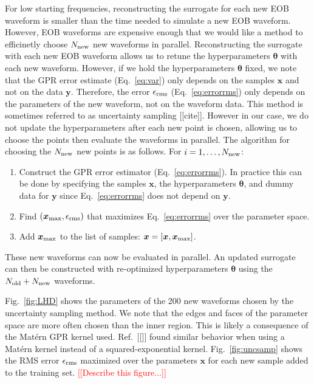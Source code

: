 \documentclass[prd,aps,letter,twocolumn,floatfix,notitlepage,nofootinbib]{revtex4-1}
\def\bx{\mathbf{x}}
\def\by{\mathbf{y}}
\def\btheta{\boldsymbol{\theta}}
\newcommand{\red}[1]{\textcolor{red}{#1}}
\begin{document}
For low starting frequencies, reconstructing the surrogate for each new EOB waveform is smaller than the time needed to simulate a new EOB waveform. However, EOB waveforms are expensive enough that we would like a method to efficinetly choose $N_{\rm new}$ new waveforms in parallel. Reconstructing the surrogate with each new EOB waveform allows us to retune the hyperparameters $\btheta$ with each new waveform. However, if we hold the hyperparameters $\btheta$ fixed, we note that the GPR error estimate (Eq.~\eqref{eq:var}) only depends on the samples $\bx$ and not on the data $\by$. Therefore, the error $\epsilon_{\rm rms}$ (Eq.~\eqref{eq:errorrms}) only depends on the parameters of the new waveform, not on the waveform data. This method is sometimes referred to as uncertainty sampling [[cite]]. However in our case, we do not update the hyperparameters after each new point is chosen, allowing us to choose the points then evaluate the waveforms in parallel. The algorithm for choosing the $N_{\rm new}$ new points is as follows.
For $i = 1, \dots, N_{\rm new}$:
\begin{enumerate}

\item Construct the GPR error estimator (Eq.~\eqref{eq:errorrms}). In practice this can be done by specifying the samples $\bx$, the hyperparameters $\btheta$, and dummy data for $\by$ since Eq.~\eqref{eq:errorrms} does not depend on $\by$.

\item Find $({\bm x}_{\rm max}, \epsilon_{\rm rms})$ that maximizes Eq.~\eqref{eq:errorrms} over the parameter space. 

\item Add ${\bm x}_{\rm max}$ to the list of samples: ${\bm x} = [{\bm x}, {\bm x}_{\rm max}]$.

\end{enumerate}
These new waveforms can now be evaluated in parallel. An updated surrogate can then be constructed with re-optimized hyperparameters $\btheta$ using the $N_{\rm old}+N_{\rm new}$ waveforms.

Fig.~\ref{fig:LHD} shows the parameters of the 200 new waveforms chosen by the uncertainty sampling method. We note that the edges and faces of the parameter space are more often chosen than the inner region. This is likely a consequence of the Mat\'{e}rn GPR kernel used. Ref.~[[]] found similar behavior when using a Mat\'{e}rn kernel instead of a squared-exponential kernel. Fig.~\ref{fig:uncsamp} shows the RMS error $\epsilon_{\rm rms}$ maximized over the parameters $\bx$ for each new sample added to the training set. \red{[[Describe this figure...]]}
\end{document}
